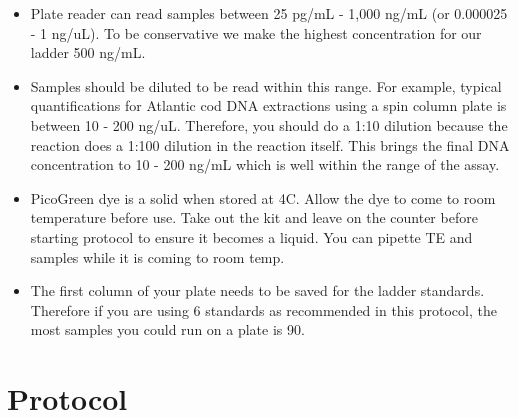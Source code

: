 \documentclass[
  letterpaper,
  DIV=11,
  numbers=noendperiod]{scrreprt}
\begin{document}
\begin{itemize}
\item
  Plate reader can read samples between 25 pg/mL - 1,000 ng/mL (or
  0.000025 - 1 ng/uL). To be conservative we make the highest
  concentration for our ladder 500 ng/mL.
\item
  Samples should be diluted to be read within this range. For example,
  typical quantifications for Atlantic cod DNA extractions using a spin
  column plate is between 10 - 200 ng/uL. Therefore, you should do a
  1:10 dilution because the reaction does a 1:100 dilution in the
  reaction itself. This brings the final DNA concentration to 10 - 200
  ng/mL which is well within the range of the assay.
\item
  PicoGreen dye is a solid when stored at 4C. Allow the dye to come to
  room temperature before use. Take out the kit and leave on the counter
  before starting protocol to ensure it becomes a liquid. You can
  pipette TE and samples while it is coming to room temp.
\item
  The first column of your plate needs to be saved for the ladder
  standards. Therefore if you are using 6 standards as recommended in
  this protocol, the most samples you could run on a plate is 90.
\end{itemize}

\hypertarget{protocol-5}{%
\section*{\texorpdfstring{\textbf{Protocol}}{Protocol}}\label{protocol-5}}
\end{document}
